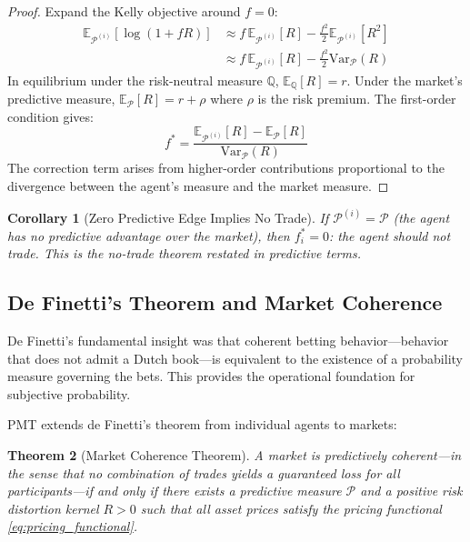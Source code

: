\documentclass[12pt,a4paper]{article}
\newtheorem{theorem}{Theorem}[section]
\newtheorem{corollary}[theorem]{Corollary}
\theoremstyle{definition}
\newcommand{\E}{\mathbb{E}}
\newcommand{\Q}{\mathbb{Q}}
\newcommand{\PP}{\mathcal{P}}
\newcommand{\Var}{\mathrm{Var}}
\begin{document}
\begin{proof}
Expand the Kelly objective around $f = 0$:
\begin{align}
    \E_{\PP^{(i)}}[\log(1 + fR)] &\approx f \, \E_{\PP^{(i)}}[R] - \frac{f^2}{2} \E_{\PP^{(i)}}[R^2] \\
    &\approx f \, \E_{\PP^{(i)}}[R] - \frac{f^2}{2} \Var_\PP(R)
\end{align}
In equilibrium under the risk-neutral measure $\Q$, $\E_\Q[R] = r$. Under the market's predictive measure, $\E_\PP[R] = r + \rho$ where $\rho$ is the risk premium. The first-order condition gives:
\begin{equation}
    f^* = \frac{\E_{\PP^{(i)}}[R] - \E_\PP[R]}{\Var_\PP(R)}
\end{equation}
The correction term arises from higher-order contributions proportional to the divergence between the agent's measure and the market measure.
\end{proof}

\begin{corollary}[Zero Predictive Edge Implies No Trade]\label{cor:no_trade}
If $\PP^{(i)} = \PP$ (the agent has no predictive advantage over the market), then $f^*_i = 0$: the agent should not trade. This is the \emph{no-trade theorem} \citep{milgrom1982} restated in predictive terms.
\end{corollary}

\subsection{De Finetti's Theorem and Market Coherence}

De Finetti's \citep{definetti1937} fundamental insight was that coherent betting behavior---behavior that does not admit a Dutch book---is equivalent to the existence of a probability measure governing the bets. This provides the operational foundation for subjective probability.

PMT extends de Finetti's theorem from individual agents to markets:

\begin{theorem}[Market Coherence Theorem]\label{thm:market_coherence}
A market is \emph{predictively coherent}---in the sense that no combination of trades yields a guaranteed loss for all participants---if and only if there exists a predictive measure $\PP$ and a positive risk distortion kernel $R > 0$ such that all asset prices satisfy the pricing functional \eqref{eq:pricing_functional}.
\end{theorem}
\end{document}
